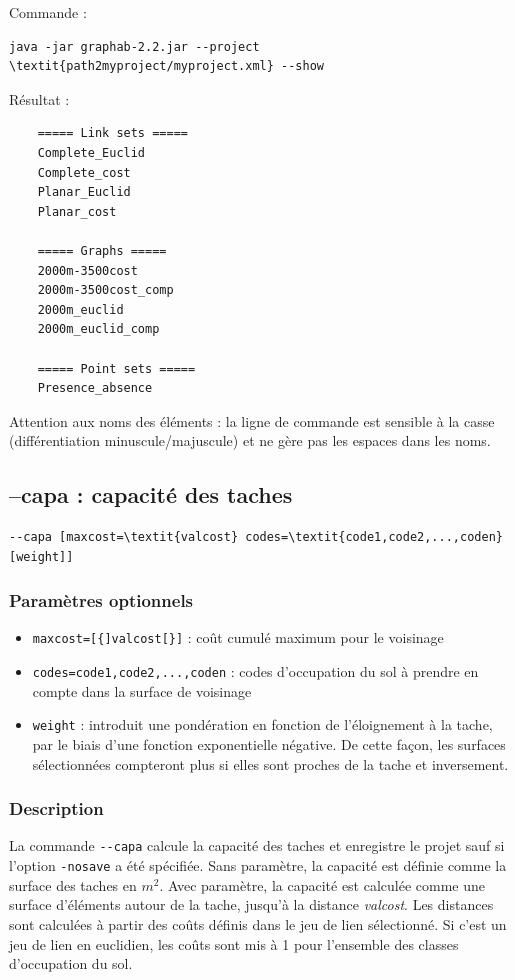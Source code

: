 \documentclass[a4paper,10pt]{report}
\begin{document}
Commande :
\begin{Verbatim}[commandchars=\\\{\}]
	java -jar graphab-2.2.jar --project \textit{path2myproject/myproject.xml} --show
\end{Verbatim}
Résultat :
\begin{Verbatim}
	===== Link sets =====
	Complete_Euclid
	Complete_cost
	Planar_Euclid
	Planar_cost
	
	===== Graphs =====
	2000m-3500cost
	2000m-3500cost_comp
	2000m_euclid
	2000m_euclid_comp
	
	===== Point sets =====
	Presence_absence
\end{Verbatim}
Attention aux noms des éléments : la ligne de commande est sensible à la casse (différentiation minuscule/majuscule) et ne gère pas les espaces dans les noms.

\subsection{--capa : capacité des taches}
\begin{Verbatim}[commandchars=\\\{\}]
--capa [maxcost=\textit{valcost} codes=\textit{code1,code2,...,coden} [weight]]
\end{Verbatim}

\subsubsection{Paramètres optionnels}
\begin{itemize}
	\item \verb|maxcost=[{]valcost[}]| : coût cumulé maximum pour le voisinage
	\item \verb|codes=code1,code2,...,coden| : codes d'occupation du sol à prendre en compte dans la surface de voisinage
	\item \verb|weight| : introduit une pondération en fonction de l’éloignement à la tache, par le biais d’une fonction exponentielle négative. De cette façon, les surfaces sélectionnées compteront plus si elles sont proches de la tache et inversement.
\end{itemize}

\subsubsection{Description}
La commande \verb|--capa| calcule la capacité des taches et enregistre le projet sauf si l'option \verb|-nosave| a été spécifiée. Sans paramètre, la capacité est définie comme la surface des taches en $m^2$. Avec paramètre, la capacité est calculée comme une surface d'éléments autour de la tache, jusqu'à la distance \textit{valcost}.
Les distances sont calculées à partir des coûts définis dans le jeu de lien sélectionné. Si c'est un jeu de lien en euclidien, les coûts sont mis à 1 pour l'ensemble des classes d'occupation du sol.
\end{document}
